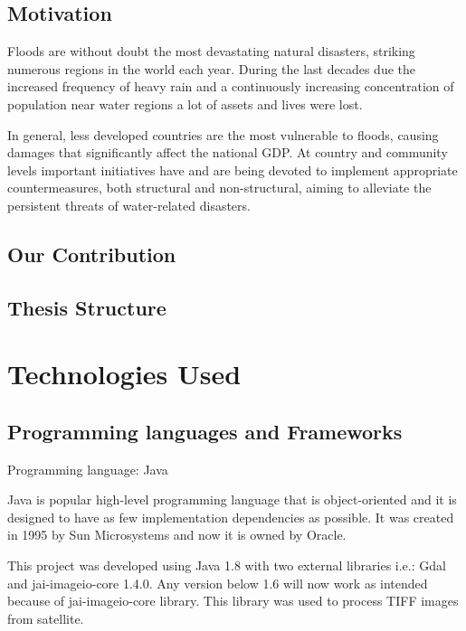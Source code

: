 \documentclass[12pt, a4paper]{report}
\begin{document}
\section{Motivation} 

Floods are without doubt the most devastating natural disasters, striking numerous regions in the world each year. During the last decades due the increased frequency of heavy rain and a continuously increasing concentration of population near water regions a lot of assets and lives were lost.
\par
In general, less developed countries are the most vulnerable to floods, causing damages that significantly affect the national GDP. At country and community levels important initiatives have and are being devoted to implement appropriate countermeasures, both structural and non-structural, aiming to alleviate the persistent threats of water-related disasters.
\par
 

\section{Our Contribution}


\section{Thesis Structure}



\newpage{}


\chapter{Technologies Used}


\section{Programming languages and Frameworks} 

{\Large Programming language: Java\par}
\medskip


Java is popular high-level programming language that is object-oriented and it is designed to have as few implementation dependencies as possible. It was created in 1995 by Sun Microsystems and now it is owned by Oracle.
\par

This project was developed using Java 1.8 with two external libraries i.e.: Gdal and jai-imageio-core 1.4.0. Any version below 1.6 will now work as intended because of jai-imageio-core library. This library was used to process TIFF images from satellite.
\par
\end{document}
